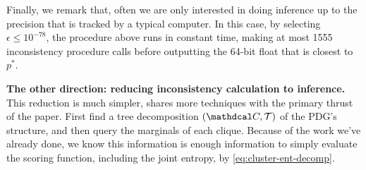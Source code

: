 \begin{lproof}
    Finally, we remark that, 
    often we are only interested in doing inference up to the precision that
    is tracked by a typical computer.
    In this case, by selecting
$\epsilon \le 10^{-78}$, the procedure above
runs in constant time, making at most 1555 
    inconsistency procedure calls before outputting
     the 64-bit float that is closest to $p^*$.

    \textbf{The other direction: reducing inconsistency calculation to inference.}
    This reduction is much simpler, shares more techniques with the primary
    thrust of the paper. First find a tree
    decomposition $(\C, \mathcal T)$ of the PDG's structure,
    and then query the marginals of each clique.  Because of the
    work we've already done, we know this information is enough
    information to simply evaluate the scoring function,
    including the joint entropy, by \eqref{eq:cluster-ent-decomp}.
\end{lproof}

